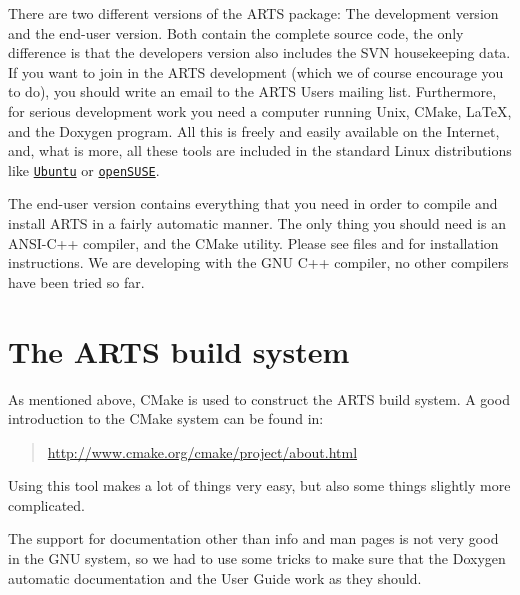 There are two different versions of the ARTS package: The development
version and the end-user version. Both contain the complete source
code, the only difference is that the developers version also includes
the SVN housekeeping data. If you want to join in the ARTS development
(which we of course encourage you to do), you should write an email to
the ARTS Users mailing list.
Furthermore, for serious development work you need a computer running
Unix, CMake, LaTeX, and the Doxygen program.  All
this is freely and easily available on the Internet, and, what is
more, all these tools are included in the standard Linux
distributions like \href{http://www.ubuntu.com/}{\nolinkurl{Ubuntu}} or \href{http://www.opensuse.org/}{\nolinkurl{openSUSE}}.

The end-user version contains everything that you need in order to
compile and install ARTS in a fairly automatic manner. The only thing
you should need is an ANSI-C++ compiler, and the CMake utility. Please
see files  and  for
installation instructions. We are developing with the GNU C++ compiler,
no other compilers have been tried so far.

\section{The ARTS build system}

As mentioned above, CMake is used to construct the ARTS
build system. A good introduction to the CMake system can be found in:
\begin{quote}
  \url{http://www.cmake.org/cmake/project/about.html}
\end{quote}
Using this tool makes a lot of things very easy, but also some
things slightly more complicated.


The support for documentation other than info and man pages is not
very good in the GNU system, so we had to use some tricks to make sure
that the Doxygen automatic documentation and the User Guide work as they
should. 

